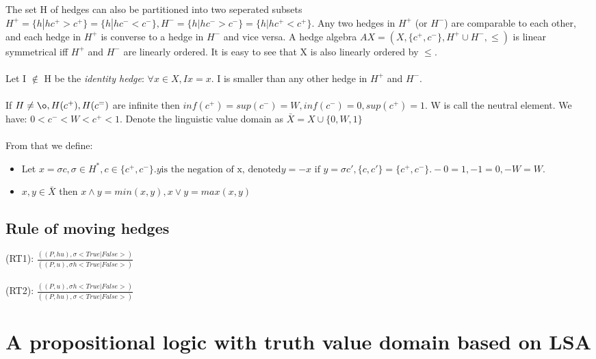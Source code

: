 \documentclass[26pt,fleqn,]{article}
\begin{document}
The set H of hedges can also be partitioned into two seperated subsets \(H^+ = \{h|hc^+ > c^+\} = 
\{h|hc^- < c^-\}, H^- = \{h|hc^- > c^-\} = 
\{h|hc^+ < c^+\}\). Any two hedges in \(H^+\) (or \(H^-\)) are comparable to each other, and each hedge in \(H^+\) is converse to a hedge in \(H^-\) and vice versa. A hedge algebra \(AX = (X,\{c^+,c^-\},H^+\cup
H^-, \le)\) is linear symmetrical iff \(H^+\) and \(H^-\) are linearly ordered. It is easy to see
that X is also linearly ordered by \(\le\).\\\\

Let I \(\notin\) H be the {\em identity hedge}: \(\forall x \in X, Ix = x\). I is smaller than any other
hedge in \(H^+\) and \(H^-\).\\\\

If \(H \neq {\o}, H(c^+), H(c^=)\) are infinite then \(inf(c^+) = sup(c^-) = W, inf(c^-) = 0, sup(c^+) = 1\). W is call the neutral element. We have: \(0<c^-<W<c^+<1\). Denote the linguistic value domain as
\(\bar X = X \cup \{0,W,1\}\)\\\\

From that we define:
\begin{itemize}
\item Let \(x = \sigma c, \sigma \in H^*, c \in \{c^+, c^-\}. y \text{is the negation of x, denoted}
	y = -x \text{ if } y = \sigma c', \{c,c'\} = \{c^+, c^-\}. -0 = 1, -1 = 0, -W = W\).
\item \(x,y \in \bar X\) then \(x \wedge y = min(x,y), x \vee y = max(x,y)\)
\end{itemize}


\subsection{Rule of moving hedges}
\indent (RT1): \(\frac{((P,hu),\sigma <True|False>)} {((P,u),\sigma h<True|False>)}\)
\\
\\
	(RT2): \(\frac{((P,u),\sigma h<True|False>)} {((P,hu),\sigma <True|False>)}\)
\section{A propositional logic with truth value domain based on LSA}
\end{document}
